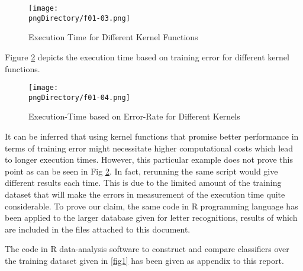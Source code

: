 \begin{figure}\centering
\texttt{[image: \\pngDirectory/f01-03.png]}
\caption{Execution Time for Different Kernel Functions}\label{fig3}
\end{figure}

Figure \ref{fig4} depicts the execution time based on training error for different kernel functions.

\begin{figure}\centering
\texttt{[image: \\pngDirectory/f01-04.png]}
\caption{Execution-Time based on Error-Rate for Different Kernels}\label{fig4}
\end{figure}

It can be inferred that using kernel functions that promise better performance in terms of training error might necessitate higher computational costs which lead to longer execution times.
However, this particular example does not prove this point as can be seen in Fig \ref{fig4}.
In fact, rerunning the same script would give different results each time.
This is due to the limited amount of the training dataset that will make the errors in measurement of the execution time quite considerable.
To prove our claim, the same code in R programming language has been applied to the larger database given for letter recognitions, results of which are included in the files attached to this document.

The code in R data-analysis software to construct and compare classifiers over the training dataset given in \ref{fig1} has been given as appendix to this report.
